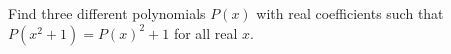 Find three different polynomials $P(x)$ with real coefficients such that $P\left(x^2 + 1\right) = P(x)^2 + 1$ for all real $x$.